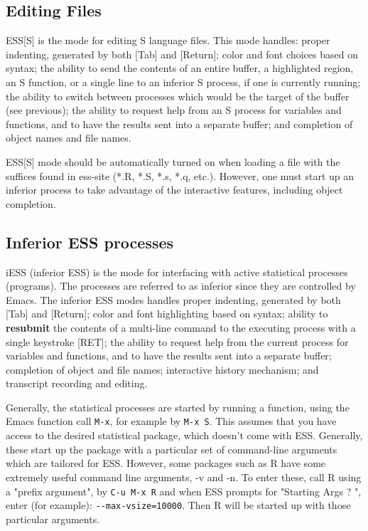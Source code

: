 \documentclass{article}
\begin{document}
\subsection{Editing Files}
\label{sec:S:edit}

ESS[S] is the mode for editing S language files.  This mode handles:
proper indenting, generated by both [Tab] and [Return]; color and font
choices based on syntax; the ability to send the contents of an entire
buffer, a highlighted region, an S function, or a single line to an
inferior S process, if one is currently running; the ability to switch
between processes which would be the target of the buffer (see
previous); the ability to request help from an S process for variables
and functions, and to have the results sent into a separate buffer;
and completion of object names and file names.

ESS[S] mode should be automatically turned on when loading a file with
the suffices found in ess-site (*.R, *.S, *.s, *.q, etc.).  However,
one must start up an inferior process to take advantage of the
interactive features, including object completion.

\subsection{Inferior ESS processes}
\label{sec:S:inf}

iESS (inferior ESS) is the mode for interfacing with active
statistical processes (programs).  The processes are referred to as
inferior since they are controlled by Emacs.  The inferior ESS modes
handles proper indenting, generated by both [Tab] and [Return]; color
and font highlighting based on syntax; ability to \textbf{resubmit}
the contents of a multi-line command to the executing process with a
single keystroke [RET]; the ability to request help from the current
process for variables and functions, and to have the results sent into
a separate buffer; completion of object and file names; interactive
history mechanism; and transcript recording and editing.

Generally, the statistical processes are started by running a
function, using the Emacs function call \verb+M-x+, for example by
\verb|M-x S|.  This assumes that you have access to the desired
statistical package, which doesn't come with ESS.  Generally, these
start up the package with a particular set of command-line arguments
which are tailored for ESS.  However, some packages such as R have
some extremely useful command line arguments, -v and -n.  To enter
these, call R using a "prefix argument", by \verb+C-u M-x R+ and when
ESS prompts for "Starting Args ? ", enter (for example):
\verb+--max-vsize=10000+.  Then R will be started up with those
particular arguments.
\end{document}
